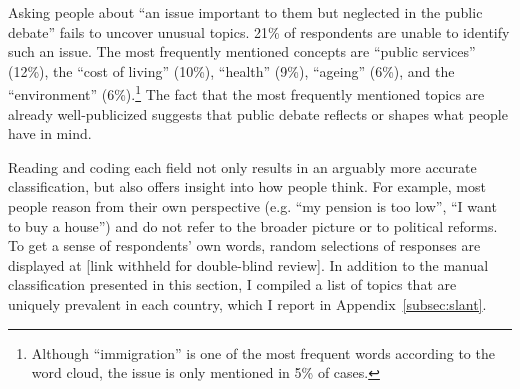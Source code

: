 \documentclass[12pt,english]{article}
\begin{document}
\begin{bibunit}
Asking people about ``an issue important to them but neglected in the public debate'' fails to uncover unusual topics. 21\% of respondents are unable to identify such an issue. %
The most frequently mentioned concepts are ``public services'' (12\%), the ``cost of living'' (10\%), ``health'' (9\%), ``ageing'' (6\%), and the ``environment'' (6\%).\footnote{Although ``immigration'' is one of the most frequent words according to the word cloud, the issue is only mentioned in 5\% of cases.} 
The fact that the most frequently mentioned topics are already well-publicized suggests that public debate reflects or shapes what people have in mind. %

Reading and coding each field not only results in an arguably more accurate classification, but also offers insight into how people think. 
For example, most people reason from their own perspective (e.g. ``my pension is too low'', ``I want to buy a house'') and do not refer to the broader picture or to political reforms. %
To get a sense of respondents' own words, random selections of responses are displayed at [link withheld for double-blind review]. %
In addition to the manual classification presented in this section, I compiled a list of topics that are uniquely prevalent in each country, which I report in Appendix~\ref{subsec:slant}. 


\end{bibunit}
\end{document}
